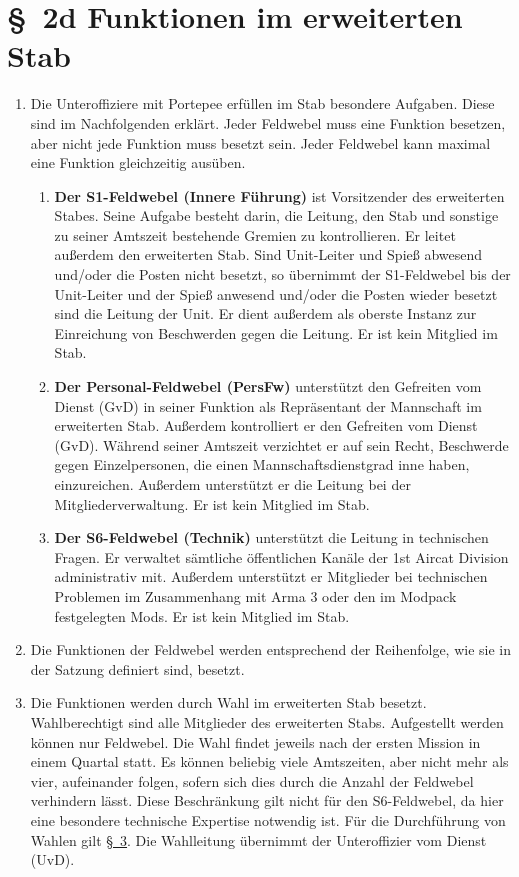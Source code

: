 \section*{\S~2d Funktionen im erweiterten Stab} 
\label{sec:funktionen_im_erweiterten_stab}

\begin{enumerate}[label=(\arabic*)]
    \item Die Unteroffiziere mit Portepee erfüllen im Stab besondere Aufgaben. Diese sind im Nachfolgenden erklärt. Jeder Feldwebel muss eine Funktion besetzen, aber nicht jede Funktion muss besetzt sein. Jeder Feldwebel kann maximal eine Funktion gleichzeitig ausüben.
    \begin{enumerate}[label=(\Alph*)]
        \item \textbf{Der S1-Feldwebel (Innere Führung)} ist Vorsitzender des erweiterten Stabes. Seine Aufgabe besteht darin, die Leitung, den Stab und sonstige zu seiner Amtszeit bestehende Gremien zu kontrollieren. Er leitet außerdem den erweiterten Stab. Sind Unit-Leiter und Spieß abwesend und/oder die Posten nicht besetzt, so übernimmt der S1-Feldwebel bis der Unit-Leiter und der Spieß anwesend und/oder die Posten wieder besetzt sind die Leitung der Unit. Er dient außerdem als oberste Instanz zur Einreichung von Beschwerden gegen die Leitung. Er ist kein Mitglied im Stab.
        \item \textbf{Der Personal-Feldwebel (PersFw)} unterstützt den Gefreiten vom Dienst (GvD) in seiner Funktion als Repräsentant der Mannschaft im erweiterten Stab. Außerdem kontrolliert er den Gefreiten vom Dienst (GvD). Während seiner Amtszeit verzichtet er auf sein Recht, Beschwerde gegen Einzelpersonen, die einen Mannschaftsdienstgrad inne haben, einzureichen. Außerdem unterstützt er die Leitung bei der Mitgliederverwaltung. Er ist kein Mitglied im Stab.
        \item \textbf{Der S6-Feldwebel (Technik)} unterstützt die Leitung in technischen Fragen. Er verwaltet sämtliche öffentlichen Kanäle der 1st Aircat Division administrativ mit. Außerdem unterstützt er Mitglieder bei technischen Problemen im Zusammenhang mit Arma 3 oder den im Modpack festgelegten Mods. Er ist kein Mitglied im Stab.
    \end{enumerate}
    \item Die Funktionen der Feldwebel werden entsprechend der Reihenfolge, wie sie in der Satzung definiert sind, besetzt.
    \item Die Funktionen werden durch Wahl im erweiterten Stab besetzt. Wahlberechtigt sind alle Mitglieder des erweiterten Stabs. Aufgestellt werden können nur Feldwebel. Die Wahl findet jeweils nach der ersten Mission in einem Quartal statt. Es können beliebig viele Amtszeiten, aber nicht mehr als vier, aufeinander folgen, sofern sich dies durch die Anzahl der Feldwebel verhindern lässt. Diese Beschränkung gilt nicht für den S6-Feldwebel, da hier eine besondere technische Expertise notwendig ist. Für die Durchführung von Wahlen gilt \hyperref[sec:abstimmungen_und_wahlen]{\S~3}. Die Wahlleitung übernimmt der Unteroffizier vom Dienst (UvD).
\end{enumerate}